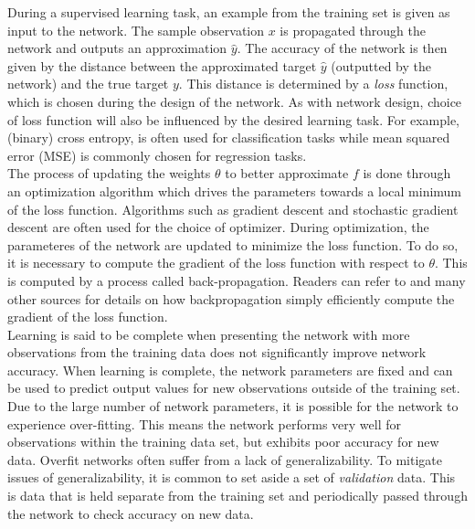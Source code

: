 \documentclass[12pt]{article}
\begin{document}
\indent During a supervised learning task, an example from the training set is given as input to the network. The sample observation $x$ is propagated through the network and outputs an approximation $\hat y$. The accuracy of the network is then given by the distance between the approximated target $\hat y$ (outputted by the network) and the true target $y$. This distance is determined by a \textit{loss} function, which is chosen during the design of the network. As with network design, choice of loss function will also be influenced by the desired learning task. For example, (binary) cross entropy, is often used for classification tasks while mean squared error (MSE) is commonly chosen for regression tasks. \\
\indent The process of updating the weights $\theta$ to better approximate $f$ is done through an optimization algorithm which drives the parameters towards a local minimum of the loss function. Algorithms such as gradient descent and stochastic gradient descent are often used for the choice of optimizer. During optimization, the parameteres of the network are updated to minimize the loss function. To do so, it is necessary to compute the gradient of the loss function with respect to $\theta$. This is computed by a process called back-propagation. Readers can refer to \cite{bengio} and many other sources for details on how backpropagation simply efficiently compute the gradient of the loss function.  \\
\indent Learning is said to be complete when presenting the network with more observations from the training data does not significantly improve network accuracy. When learning is complete, the network parameters are fixed and can be used to predict output values for new observations outside of the training set. Due to the large number of network parameters, it is possible for the network to experience over-fitting. This means the network performs very well for observations within the training data set, but exhibits poor accuracy for new data. Overfit networks often suffer from a lack of generalizability. To mitigate issues of generalizability, it is common to set aside a set of \textit{validation} data. This is data that is held separate from the training set and periodically passed through the network to check accuracy on new data.  \\
\end{document}
